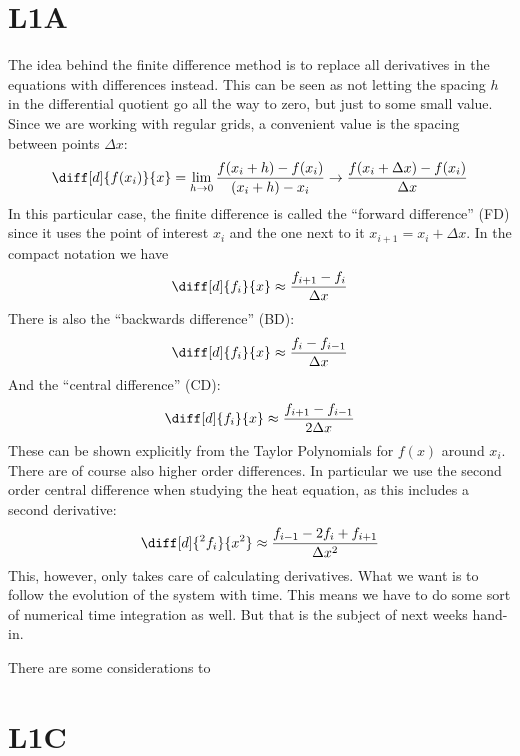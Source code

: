 \documentclass[sigconf]{acmart}
\begin{document}
\section{L1A}
The idea behind the finite difference method is to replace all derivatives in the equations with differences instead. This can be seen as not letting the spacing $ h $ in the differential quotient go all the way to zero, but just to some small value. Since we are working with regular grids, a convenient value is the spacing between points $ \Delta x $:
\begin{equation}\label{key}
	\diff[d]{f(x_i)}{x} = \lim\limits_{h\to 0} \frac{f(x_i + h) - f(x_i)}{(x_i+h) - x_i} \to \frac{f(x_i + \Delta x) - f(x_i)}{\Delta x}
\end{equation}
In this particular case, the finite difference is called the ``forward difference'' (FD) since it uses the point of interest $ x_i $ and the one next to it $ x_{i+1} = x_i + \Delta x $. In the compact notation we have
\begin{equation}\label{key}
	\diff[d]{f_i}{x} \approx \frac{f_{i+1} - f_{i}}{\Delta x}
\end{equation}
There is also the ``backwards difference'' (BD):
\begin{equation}\label{key}
	\diff[d]{f_i}{x} \approx \frac{f_{i} - f_{i-1}}{\Delta x}
\end{equation}
And the ``central difference'' (CD):
\begin{equation}\label{key}
	\diff[d]{f_i}{x} \approx \frac{f_{i+1} - f_{i-1}}{2 \Delta x}
\end{equation}
These can be shown explicitly from the Taylor Polynomials for $ f(x) $ around $ x_i $. There are of course also higher order differences. In particular we use the second order central difference when studying the heat equation, as this includes a second derivative:
\begin{equation}\label{key}
	\diff[d]{^2 f_i}{x^2} \approx \frac{f_{i-1} - 2f_i + f_{i+1}}{\Delta x^2}
\end{equation}
This, however, only takes care of calculating derivatives. What we want is to follow the evolution of the system with time. This means we have to do some sort of numerical time integration as well. But that is the subject of next weeks hand-in.

There are some considerations to 

\section{L1C}
\end{document}
